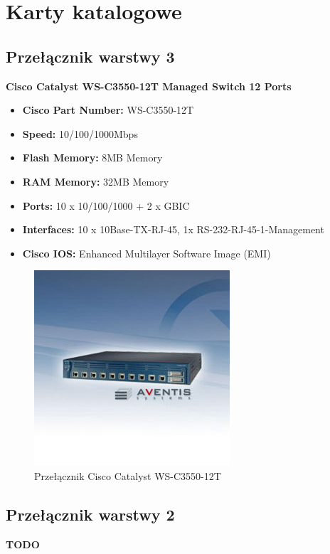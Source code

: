 \newpage
\section{Karty katalogowe}
\subsection{Przełącznik warstwy 3}
\textbf{Cisco Catalyst WS-C3550-12T Managed Switch 12 Ports} 
\begin{itemize}
	\item \textbf{Cisco Part Number:} WS-C3550-12T
	\item \textbf{Speed:} 10/100/1000Mbps
	\item \textbf{Flash Memory:} 8MB Memory
	\item \textbf{RAM Memory:} 32MB Memory
	\item \textbf{Ports:} 10 x 10/100/1000 + 2 x GBIC
	\item \textbf{Interfaces:} 10 x 10Base-TX-RJ-45, 1x RS-232-RJ-45-1-Management
	\item \textbf{Cisco IOS:} Enhanced Multilayer Software Image (EMI)
\end{itemize}

\begin{figure}[htbp]
	\begin{center}
        \includegraphics[scale = 1.0]{img/switchL3.jpg}
        \caption{Przełącznik Cisco Catalyst WS-C3550-12T}
    \end{center}
\end{figure}

 \subsection{Przełącznik warstwy 2}
 \textbf{TODO}

